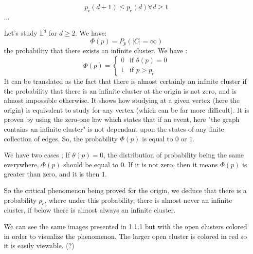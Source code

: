 \documentclass{article}
\begin{document}
$$p_c(d + 1) \leq p_c(d) \forall d \geq 1$$
...

Let's study $\mathbb{L}^d$ for $d \geq 2$.
We have:
$$\Phi(p)=P_p(|C|=\infty)$$
the probability that there exists an infinite cluster. We have :
$$
\Phi(p) = \left\{
    \begin{array}{ll}
        0 & \mbox{if $\theta(p)=0$}\\
        1 & \mbox{if $p > p_c$}
    \end{array}
\right.
$$
It can be translated as the fact that there is almost certainly an infinite cluster if the probability that there is an infinite cluster at the origin is not zero, and is almost impossible otherwise. It shows how studying at a given vertex (here the origin) is equivalent to study for any vertex (which can be far more difficult). It is proven by using the zero-one law which states that if an event, here "the graph contains an infinite cluster" is not dependant upon the states of any finite collection of edges. So, the probability $\Phi(p)$ is equal to $0$ or $1$.

We have two cases ;
If $\theta(p)=0$, the distribution of probability being the same everywhere, $\Phi(p)$ should be equal to $0$.
If it is not zero, then it means $\Phi(p)$ is greater than zero, and it is then $1$.

So the critical phenomenon being proved for the origin, we deduce that there is a probability $p_c$, where under this probability, there is almost never an infinite cluster, if below there is almost always an infinite cluster.

We can see the same images presented in 1.1.1 but with the open clusters colored in order to visualize the phenomenon. The larger open cluster is colored in red so it is easily viewable. (?)
\end{document}
